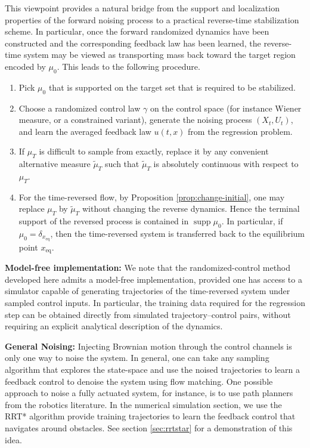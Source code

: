 \documentclass{article}
\begin{document}
This viewpoint provides a natural bridge from the support and localization properties of the forward noising process to a practical reverse-time stabilization scheme. In particular, once the forward randomized dynamics have been constructed and the corresponding feedback law has been learned, the reverse-time system may be viewed as transporting mass back toward the target region encoded by $\mu_0$. This leads to the following procedure.
\begin{enumerate}
\item Pick $\mu_0$ that is supported on the target set that is required to be stabilized.

\item Choose a randomized control law $\gamma$ on the control space (for instance Wiener measure, or a constrained variant), generate the noising process $(X_t,U_t)$, and learn the averaged feedback law $u(t,x)$ from the regression problem.

\item If $\mu_T$ is difficult to sample from exactly, replace it by any convenient alternative measure $\tilde{\mu}_T$ such that $\tilde{\mu}_T$  is absolutely continuous with respect to $\mu_T$.

\item For the time-reversed flow, by Proposition \ref{prop:change-initial}, one may replace $\mu_T$ by $\tilde{\mu}_T$ without changing the reverse dynamics. Hence the terminal support of the reversed process is contained in $\operatorname{supp}\mu_0$. In particular, if $\mu_0 = \delta_{x_{\mathrm{eq}}}$, then the time-reversed system is transferred back to the equilibrium point $x_{\mathrm{eq}}$.
\end{enumerate}

\textbf{Model-free implementation:} We note that the randomized-control method developed here admits a model-free implementation, provided one has access to a simulator capable of generating trajectories of the time-reversed system under sampled control inputs. In particular, the training data required for the regression step can be obtained directly from simulated trajectory--control pairs, without requiring an explicit analytical description of the dynamics.

\textbf{General Noising:} Injecting Brownian motion through the control channels is only one way to noise the system. In general, one can take any sampling algorithm that explores the state-space and use the noised trajectories to learn a feedback control to denoise the system using flow matching. One possible approach to noise a fully actuated system, for instance, is to use path planners from the robotics literature. In the numerical simulation section, we use the RRT* algorithm \cite{karaman2011sampling} provide training trajectories to learn the feedback control that navigates around obstacles. See section \ref{sec:rrtstar} for a demonstration of this idea.
\end{document}

